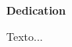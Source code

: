 \newpage
\begin{center}
    {\bf \Huge Dedication}
\end{center}
\vspace{1cm}
\setlength{\baselineskip}{0.8cm}

Texto...